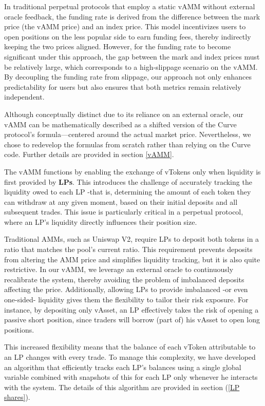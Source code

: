 \documentclass{article}
\begin{document}
In traditional perpetual protocols that employ a static vAMM without external oracle feedback, the funding rate is derived from the difference between the mark price (the vAMM price) and an index price. This model incentivizes users to open positions on the less popular side to earn funding fees, thereby indirectly keeping the two prices aligned. However, for the funding rate to become significant under this approach, the gap between the mark and index prices must be relatively large, which corresponds to a high-slippage scenario on the vAMM. By decoupling the funding rate from slippage, our approach not only enhances predictability for users but also ensures that both metrics remain relatively independent.

Although conceptually distinct due to its reliance on an external oracle, our vAMM can be mathematically described as a shifted version of the Curve protocol’s formula—centered around the actual market price. Nevertheless, we chose to redevelop the formulas from scratch rather than relying on the Curve code. Further details are provided in section \ref{vAMM}.

The vAMM functions by enabling the exchange of vTokens only when liquidity is first provided by \textbf{LPs}. This introduces the challenge of accurately tracking the liquidity owed to each LP -that is, determining the amount of each token they can withdraw at any given moment, based on their initial deposits and all subsequent trades. This issue is particularly critical in a perpetual protocol, where an LP’s liquidity directly influences their position size.

Traditional AMMs, such as Uniswap V2, require LPs to deposit both tokens in a ratio that matches the pool’s current ratio. This requirement prevents deposits from altering the AMM price and simplifies liquidity tracking, but it is also quite restrictive. In our vAMM, we leverage an external oracle to continuously recalibrate the system, thereby avoiding the problem of imbalanced deposits affecting the price. Additionally, allowing LPs to provide imbalanced -or even one-sided- liquidity gives them the flexibility to tailor their risk exposure. For instance, by depositing only vAsset, an LP effectively takes the risk of opening a passive short position, since traders will borrow (part of) his vAsset to open long positions.

This increased flexibility means that the balance of each vToken attributable to an LP changes with every trade. To manage this complexity, we have developed an algorithm that efficiently tracks each LP’s balances using a single global variable combined with snapshots of this for each LP only whenever he interacts with the system. The details of this algorithm are provided in section (\ref{LP shares}).
\end{document}
